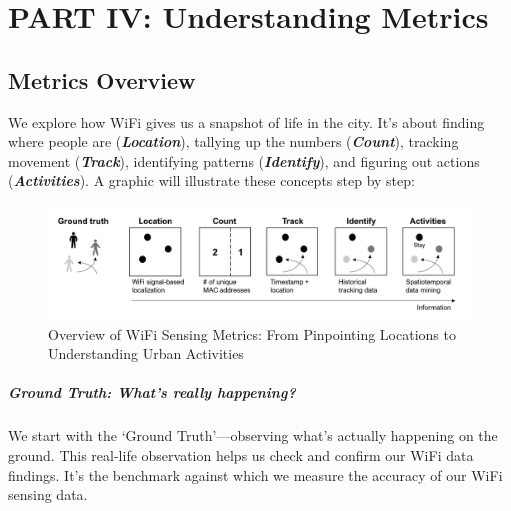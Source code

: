 \documentclass[
  letterpaper,
]{scrbook}
\begin{document}
\part{PART IV: Understanding Metrics}

\hypertarget{metrics-overview}{%
\chapter{Metrics Overview}\label{metrics-overview}}

We explore how WiFi gives us a snapshot of life in the city. It's about
finding where people are (\emph{\textbf{Location}}), tallying up the
numbers (\emph{\textbf{Count}}), tracking movement
(\emph{\textbf{Track}}), identifying patterns
(\emph{\textbf{Identify}}), and figuring out actions
(\emph{\textbf{Activities}}). A graphic will illustrate these concepts
step by step:

\begin{figure}

{\centering \includegraphics{content/material/ch4/metric-overview.png}

}

\caption{Overview of WiFi Sensing Metrics: From Pinpointing Locations to
Understanding Urban Activities}

\end{figure}

\hypertarget{ground-truth-whats-really-happening}{%
\subsubsection*{\texorpdfstring{\textbf{Ground Truth: What's really
happening?}}{Ground Truth: What's really happening?}}\label{ground-truth-whats-really-happening}}

We start with the `Ground Truth'---observing what's actually happening
on the ground. This real-life observation helps us check and confirm our
WiFi data findings. It's the benchmark against which we measure the
accuracy of our WiFi sensing data.
\end{document}

